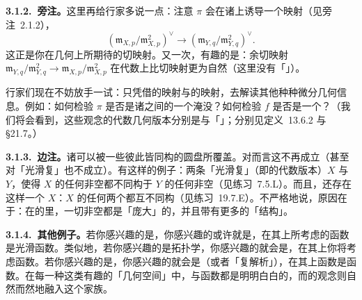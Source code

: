 \textbf{3.1.2.\ 旁注。}\quad 这里再给行家多说一点：注意 $\pi$ 会在诸\trTangentSpace{}上诱导一个映射（见旁注~2.1.2），
\[
(\mathfrak{m}_{X,p}/\mathfrak{m}_{X,p}^2)^{\vee}\longrightarrow(\mathfrak{m}_{Y,q}/\mathfrak{m}_{Y,q}^2)^{\vee}.
\]
这正是你在几何上所期待的切映射。又一次，有趣的是：余切映射 $\mathfrak{m}_{Y,q}/\mathfrak{m}_{Y,q}^2\to\mathfrak{m}_{X,p}/\mathfrak{m}_{X,p}^2$ 在代数上比切映射更为自然（这里没有「\trDual」）。

行家们现在不妨放手一试：只凭借\trTopologicalSpace{}的映射与\trSheaf{}的映射，去解读其他种种微分几何信息。例如：如何检验 $\pi$ 是否是诸\trManifold{}之间的一个淹没？如何检验 $f$ 是否是一个\trImmersion？（我们将会看到，这些观念的代数几何版本分别是\trSmooth\trMorphism{}与「\trUnramified\trMorphism」；分别见\mbox{定义~13.6.2} 与 \S21.7。）

\textbf{3.1.3.\ 边注。}\quad 诸\trManifold{}可以被一些彼此皆同构的圆盘所覆盖。对\trScheme{}而言这不再成立（甚至对「光滑复\trVariety」也不成立）。有这样的例子：两条「光滑复\trCurve」（即\trRiemannSurface{}的代数版本）$X$ 与 $Y$，使得 $X$ 的任何非空\trOpenSubset{}都不同构于 $Y$ 的任何非空\trOpenSubset{}（见练习~7.5.L）。而且，还存在这样一个\trRiemannSurface{} $X$：$X$ 的任何两个\trOpenSubset{}都互不同构（见练习~19.7.E）。不严格地说，原因在于：在\trScheme{}的\trZariskiTopology{}里，一切非空\trOpenSet{}都是「庞大」的，并且带有更多的「结构」。

\textbf{3.1.4.\ 其他例子。}\quad 若你感兴趣的是\trDifferentialGeometry，你感兴趣的或许就是\trDifferentiable\trManifold，在其上所考虑的函数是光滑函数。类似地，若你感兴趣的是拓扑学，你感兴趣的就会是\trTopologicalSpace，在其上你将考虑\trContinuous{}函数。若你感兴趣的是\trComplexGeometry，你感兴趣的就会是\trComplex\trManifold（或者「复解析\trVariety」），在其上函数是\trHolomorphic{}函数。在每一种这类有趣的「几何空间」中，\trTopologicalSpace{}与函数\trSheaf{}都是明明白白的，而\trScheme{}的观念则自然而然地融入这个家族。
